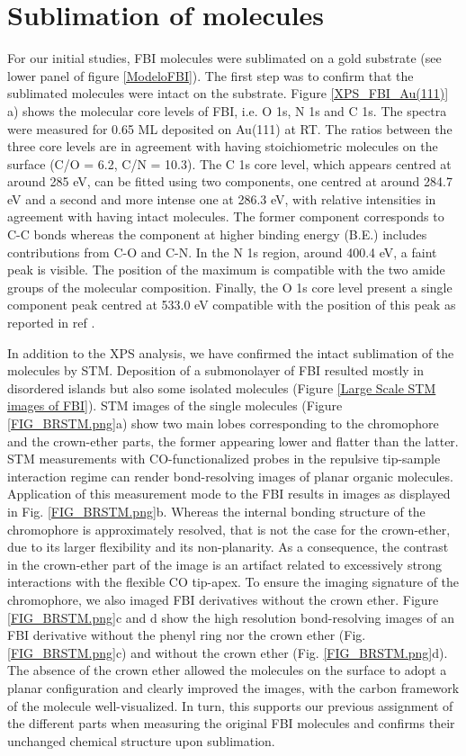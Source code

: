 \documentclass[aps,prl,reprint,longbibliography,superscriptaddress, english]{revtex4-1}
\begin{document}
\section{Sublimation of molecules}
For our initial studies, FBI molecules were sublimated on a gold substrate (see lower panel of figure \ref{ModeloFBI}). The first step was 
to confirm that the sublimated molecules were intact on the substrate. Figure \ref{XPS_FBI_Au(111)} a) shows the molecular core levels of FBI, i.e. O 1s, N 1s and C 1s. The spectra were measured for 0.65 ML deposited on Au(111) at RT. The ratios between the three core levels are in agreement with having stoichiometric molecules on the surface (C/O = 6.2, C/N = 10.3). The C 1s core level, which appears centred at around 285 eV, can be fitted using two components, one centred at around 284.7 eV and a second and more intense one at 286.3 eV, with relative intensities in agreement with having intact molecules. The former component corresponds to C-C bonds whereas the component at higher binding energy (B.E.) includes contributions from C-O and C-N. In the N 1s region, around 400.4 eV, a faint peak is visible. The position of the maximum is compatible with the two amide groups of the molecular composition. Finally, the O 1s core level present a single component peak centred at 533.0 eV compatible with the position of this peak as reported in ref \cite{stredansky_-surface_2019}. 

In addition to the XPS analysis, we have confirmed the intact sublimation of the molecules by STM. Deposition of a submonolayer of FBI resulted mostly in disordered islands but also some isolated molecules (Figure \ref{Large Scale STM images of FBI}). STM images of the single molecules (Figure  \ref{FIG_BRSTM.png}a) show two main lobes corresponding to the chromophore and the crown-ether parts, the former appearing lower and flatter than the latter. STM measurements with CO-functionalized probes in the repulsive tip-sample interaction regime can render bond-resolving images of planar organic molecules.\cite{gross_recent_2011,gross_atomic_2018} Application of this measurement mode to the FBI results in images as displayed in Fig. \ref{FIG_BRSTM.png}b.  Whereas the internal bonding structure of the chromophore is approximately resolved, that is not the case for the crown-ether, due to its larger flexibility and its non-planarity. As a consequence, the contrast in the crown-ether part of the image is an artifact related to excessively strong interactions with the flexible CO tip-apex.\cite{moll_mechanisms_2010,hapala_mechanism_2014} To ensure the imaging signature of the chromophore, we also imaged FBI derivatives without the crown ether. Figure  \ref{FIG_BRSTM.png}c and d show the high resolution bond-resolving images of an FBI derivative without the phenyl ring nor the crown ether (Fig. \ref{FIG_BRSTM.png}c)  and without the crown ether (Fig. \ref{FIG_BRSTM.png}d). The absence of the crown ether allowed the molecules on the surface to adopt a planar configuration and clearly improved the images, with the carbon framework of the molecule well-visualized. In turn, this supports our previous assignment of the different parts when measuring the original FBI molecules and confirms their unchanged chemical structure upon sublimation.  
\end{document}
